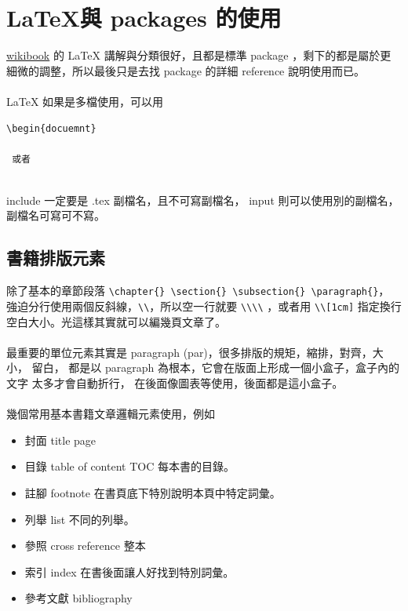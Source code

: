 \chapter{\LaTeX 與 packages 的使用}
\href{https://en.wikibooks.org/wiki/LaTeX}{wikibook} 
的 {\LaTeX} 講解與分類很好，且都是標準 package ，剩下的都是屬於更
細微的調整，所以最後只是去找 package 的詳細 reference 說明使用而已。
\\\\
{\LaTeX} 如果是多檔使用，可以用
\begin{verbatim}
\begin{docuemnt}

 或者


\end{verbatim}
include 一定要是 .tex 副檔名，且不可寫副檔名，
input 則可以使用別的副檔名，副檔名可寫可不寫。

\section{書籍排版元素}
除了基本的章節段落 \verb=\chapter{} \section{} \subsection{} \paragraph{}=，
強迫分行使用兩個反斜線，\verb=\\=，所以空一行就要 \verb=\\\\=
，或者用 \verb=\\[1cm]= 指定換行空白大小。光這樣其實就可以編幾頁文章了。
\\\\
最重要的單位元素其實是 paragraph (par)，很多排版的規矩，縮排，對齊，大小，
留白， 都是以 paragraph 為根本，它會在版面上形成一個小盒子，盒子內的文字
太多才會自動折行， 在後面像圖表等使用，後面都是這小盒子。 
\\\\
幾個常用基本書籍文章邏輯元素使用，例如
\begin{itemize}
\item 封面 title page
\item 目錄 table of content TOC 每本書的目錄。
\item 註腳 footnote 在書頁底下特別說明本頁中特定詞彙。
\item 列舉 list 不同的列舉。
\item 參照 cross reference 整本
\item 索引 index 在書後面讓人好找到特別詞彙。
\item 參考文獻 bibliography
\end{itemize}

